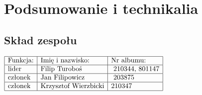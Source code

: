 \documentclass[a4paper,12pt,twoside]{article}
\theoremstyle{plain}
\theoremstyle{definition}
\theoremstyle{remark}
\begin{document}
%
\tableofcontents
\section{Podsumowanie i technikalia}
\subsection{Skład zespołu}
$\begin{array}{|l|l|l|}
	\hline
	\textrm{Funkcja:}& \textrm{Imię i nazwisko: }& \textrm{Nr albumu: }\\
	\hline
	\textrm{lider}& \textrm{Filip Turoboś}&\textrm{ 210344, 801147}\\
	\hline
	\textrm{członek}&\textrm{Jan Filipowicz}&\textrm{	203875 	}\\
	\hline
	\textrm{członek}&\textrm{Krzysztof Wierzbicki}& \textrm{210347}\\
	\hline
\end{array}$
\end{document}
